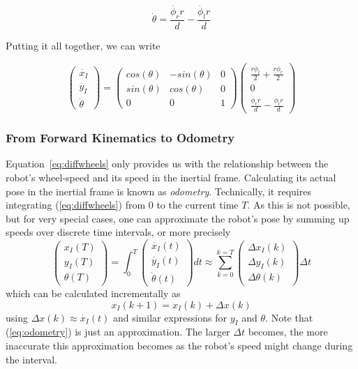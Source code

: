 \begin{equation}
\dot{\theta}=\frac{\dot{\phi_r} r}{d}-\frac{\dot{\phi_l} r}{d}
\end{equation}

Putting it all together, we can write

\begin{equation}\label{eq:diffwheels}
\left(\begin{array}{c} \dot{x_I}\\\dot{y_I}\\\dot{\theta}\end{array}\right)=\left(\begin{array}{ccc}
cos(\theta) & -sin(\theta) & 0 \\
sin(\theta) & cos(\theta) & 0 \\
0 & 0 & 1\end{array}\right)\left(\begin{array}{c}\frac{r\dot{\phi_l}}{2}+\frac{r\dot{\phi_r}}{2}\\0\\\frac{\dot{\phi_r} r}{d}-\frac{\dot{\phi_l} r}{d}\end{array}\right)
\end{equation}

\subsubsection{From Forward Kinematics to Odometry}
Equation~\ref{eq:diffwheels} only provides us with the relationship between the robot's wheel-speed and its speed in the inertial frame. Calculating its actual pose in the inertial frame is known as \emph{odometry}. Technically, it requires integrating (\ref{eq:diffwheels}) from 0 to the current time $T$. As this is not possible, but for very special cases, one can approximate the robot's pose by summing up speeds over discrete time intervals, or more precisely
\begin{equation}
\left(\begin{array}{c} {x_I}(T)\\{y_I}(T)\\{\theta}(T)\end{array}\right)=
\int_0^T \left(\begin{array}{c} \dot{x_I}(t)\\\dot{y_I}(t)\\\dot{\theta}(t)\end{array}\right) dt \approx
\sum_{k=0}^{k=T}\left(\begin{array}{c} \Delta{x_I}(k)\\\Delta{y_I}(k)\\\Delta{\theta}(k)\end{array}\right)\Delta t
\end{equation} which can be calculated incrementally as
\begin{equation}\label{eq:odometry}
x_I(k+1)=x_I(k)+\Delta x (k)
\end{equation}
using $\Delta x(k) \approx \dot{x_I}(t)$ and similar expressions for $y_I$ and $\theta$. Note that (\ref{eq:odometry}) is just an approximation. The larger $\Delta t$ becomes, the more inaccurate this approximation becomes as the robot's speed might change during the interval.

